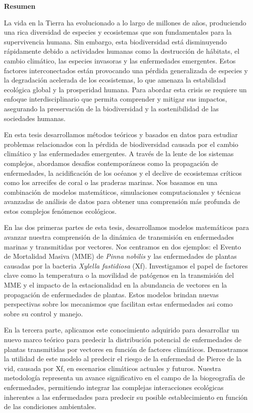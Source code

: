 \pagebreak
\thispagestyle{empty}

\begin{center}
    \textbf{\Large Resumen}
\end{center}

La vida en la Tierra ha evolucionado a lo largo de millones de años,
produciendo una rica diversidad de especies y ecosistemas que
son fundamentales para la supervivencia humana. Sin embargo, esta biodiversidad
está disminuyendo rápidamente debido a actividades humanas como la destrucción
de hábitats, el cambio climático, las especies invasoras y las enfermedades
emergentes. Estos factores interconectados están provocando una pérdida
generalizada de especies y la degradación acelerada de los ecosistemas, lo que
amenaza la estabilidad ecológica global y la prosperidad humana. Para abordar
esta crisis se requiere un enfoque interdisciplinario que permita comprender y
mitigar sus impactos, asegurando la preservación de la biodiversidad y la
sostenibilidad de las sociedades humanas.

En esta tesis desarrollamos métodos teóricos y basados en datos para estudiar
problemas relacionados con la pérdida de biodiversidad causada por el cambio
climático y las enfermedades emergentes. A través de la lente de los sistemas
complejos, abordamos desafíos contemporáneos como la propagación de
enfermedades, la acidificación de los océanos y el declive de ecosistemas
críticos como los arrecifes de coral o las praderas marinas. Nos basamos en una
combinación de modelos matemáticos, simulaciones computacionales y técnicas
avanzadas de análisis de datos para obtener una comprensión más profunda de
estos complejos fenómenos ecológicos.

En las dos primeras partes de esta tesis, desarrollamos modelos matemáticos
para avanzar nuestra comprensión de la dinámica de transmisión en enfermedades
marinas y transmitidas por vectores. Nos centramos en dos ejemplos: el Evento
de Mortalidad Masiva (MME) de \textit{Pinna nobilis} y las enfermedades de
plantas causadas por la bacteria \textit{Xylella fastidiosa} (Xf). Investigamos
el papel de factores clave como la temperatura o la movilidad de patógenos en
la transmisión del MME y el impacto de la estacionalidad en la abundancia de
vectores en la propagación de enfermedades de plantas. Estos modelos brindan
nuevas perspectivas sobre los mecanismos que facilitan estas enfermedades asi
como sobre su control y manejo.

En la tercera parte, aplicamos este conocimiento adquirido para desarrollar un
nuevo marco teórico para predecir la distribución potencial de enfermedades de
plantas transmitidas por vectores en función de factores climáticos.
Demostramos la utilidad de este modelo al predecir el riesgo de la
enfermedad de Pierce de la vid, causada por Xf, en escenarios climáticos
actuales y futuros. Nuestra metodología representa un avance significativo en
el campo de la biogeografía de enfermedades, permitiendo integrar las complejas
interacciones ecológicas inherentes a las enfermedades para predecir su posible
establecimiento en función de las condiciones ambientales.

